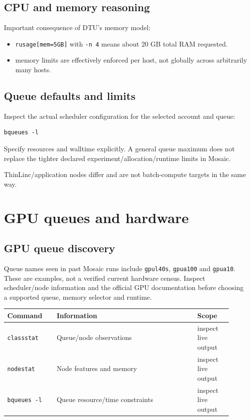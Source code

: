\documentclass[11pt,a4paper]{article}
\begin{document}
\subsection{CPU and memory reasoning}

Important consequence of DTU's memory model:

\begin{itemize}[leftmargin=1.5em]
  \item \texttt{rusage[mem=5GB]} with \texttt{-n 4} means about 20 GB total RAM requested.
  \item memory limits are effectively enforced per host, not globally across arbitrarily many hosts.
\end{itemize}

\subsection{Queue defaults and limits}

Inspect the actual scheduler configuration for the selected account and queue:

\begin{lstlisting}[style=shell]
bqueues -l
\end{lstlisting}

Specify resources and walltime explicitly. A general queue maximum does not
replace the tighter declared experiment/allocation/runtime limits in Mosaic.

ThinLinc/application nodes differ and are not batch-compute targets in the same way.

\section{GPU queues and hardware}

\subsection{GPU queue discovery}

Queue names seen in past Mosaic runs include \texttt{gpul40s}, \texttt{gpua100}
and \texttt{gpua10}. These are examples, not a verified current hardware census.
Inspect scheduler/node information and the official GPU documentation before
choosing a supported queue, memory selector and runtime.

\begin{longtable}{p{0.20\linewidth} p{0.58\linewidth} p{0.14\linewidth}}
\toprule
Command & Information & Scope \\
\midrule
\texttt{classstat} & Queue/node observations & inspect live output \\
\texttt{nodestat} & Node features and memory & inspect live output \\
\texttt{bqueues -l} & Queue resource/time constraints & inspect live output \\
\bottomrule
\end{longtable}
\end{document}
